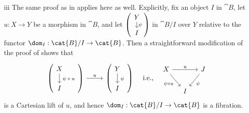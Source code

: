 \begin{partsolution}{iii}
The same proof as in  applies here as well.
Explicitly, fix an object \(I\) in \(\cat{B}\), let \(u : X \to Y\) be a morphism in \(\cat{B}\), and let \(\begin{pmatrix}\begin{tikzcd}[row sep=small] Y \arrow[d, "\psi"] \\ I\end{tikzcd}\end{pmatrix}\) in \(\cat{B} / I\) over \(Y\) relative to the functor \(\dom_I : \cat{B} / I \to \cat{B}\).
Then a straightforward modification of the proof of  shows that
\begin{align*}
\begin{tikzcd}[ampersand replacement=\&,]
\begin{pmatrix}
\begin{tikzpicture}
        \node(1){\(X\)}; 
        \node(2)[below of=1]{\(I\)};
        \draw[->](1)--node[right]{\scriptsize\(\psi \circ u\)} (2);
\end{tikzpicture}
\end{pmatrix}
\arrow[r, "u"]
\&
\begin{pmatrix}
\begin{tikzpicture}
        \node(1){\(Y\)};
        \node(2)[below of=1]{\(I\)};
        \draw[->](1)--node[right]{\scriptsize\(\psi\)} (2);
\end{tikzpicture}
\end{pmatrix}
\end{tikzcd}&& \text{i.e.,}
&&
\begin{tikzcd}[ampersand replacement=\&, column sep=small]
X \arrow[rr, "u"] \arrow[dr, "\psi \circ u"{below left}] \& \& J \arrow[dl, "\psi"] \\
\& I
\end{tikzcd}
\end{align*}
is a Cartesian lift of \(u\), and hence \(\dom_I : \cat{B} / I \to \cat{B}\) is a fibration.
\end{partsolution}